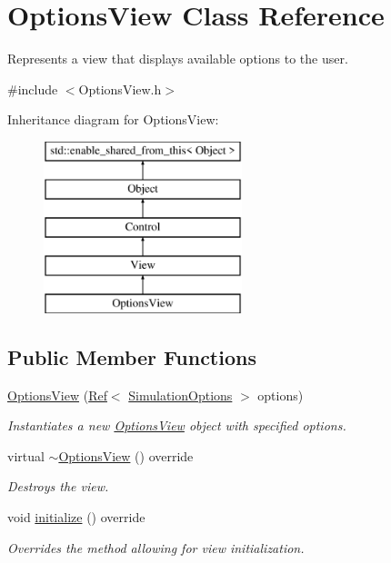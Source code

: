 \hypertarget{class_options_view}{}\section{Options\+View Class Reference}
\label{class_options_view}


Represents a view that displays available options to the user.  




{\ttfamily \#include $<$Options\+View.\+h$>$}

Inheritance diagram for Options\+View\+:\begin{figure}[H]
\begin{center}
\leavevmode
\includegraphics[height=5.000000cm]{class_options_view}
\end{center}
\end{figure}
\subsection*{Public Member Functions}
\begin{DoxyCompactItemize}
\item 
\mbox{\hyperlink{class_options_view_a36369175e23e38e549788ed02076b4f1}{Options\+View}} (\mbox{\hyperlink{class_ref}{Ref}}$<$ \mbox{\hyperlink{class_simulation_options}{Simulation\+Options}} $>$ options)
\begin{DoxyCompactList}\small\item\em Instantiates a new \mbox{\hyperlink{class_options_view}{Options\+View}} object with specified options. \end{DoxyCompactList}\item 
virtual \mbox{\hyperlink{class_options_view_a1928636df04508ec0e1f05ca0b2b8706}{$\sim$\+Options\+View}} () override
\begin{DoxyCompactList}\small\item\em Destroys the view. \end{DoxyCompactList}\item 
void \mbox{\hyperlink{class_options_view_a0b35f3f0d318997b9600f1da91d58916}{initialize}} () override
\begin{DoxyCompactList}\small\item\em Overrides the method allowing for view initialization. \end{DoxyCompactList}\end{DoxyCompactItemize}
